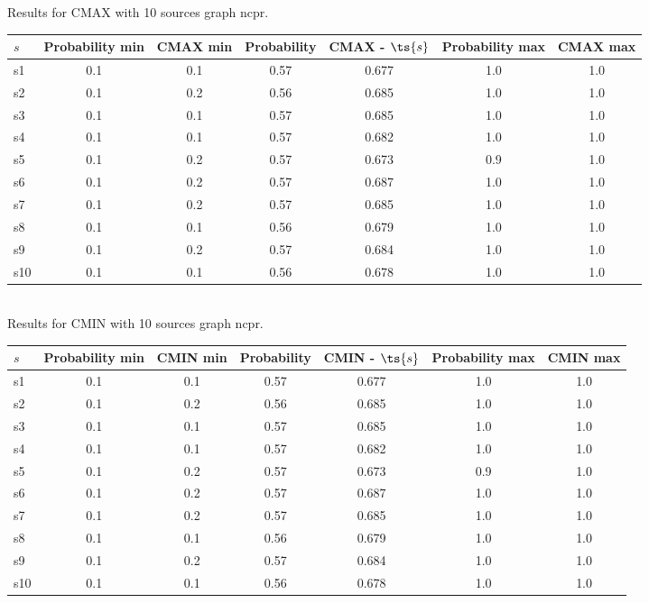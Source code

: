 \documentclass{article}
\begin{document}
\noindent Results for CMAX with 10 sources graph ncpr.

\noindent\begin{tabular}{|l|c|c|c|c|c|c|}
\hline
$s$& Probability min & CMAX min & Probability & CMAX - $\ts{s}$ & Probability max & CMAX max\\
\hline
s1 &0.1 & 0.1 & 0.57 & 0.677 & 1.0 & 1.0\\
\hline
s2 &0.1 & 0.2 & 0.56 & 0.685 & 1.0 & 1.0\\
\hline
s3 &0.1 & 0.1 & 0.57 & 0.685 & 1.0 & 1.0\\
\hline
s4 &0.1 & 0.1 & 0.57 & 0.682 & 1.0 & 1.0\\
\hline
s5 &0.1 & 0.2 & 0.57 & 0.673 & 0.9 & 1.0\\
\hline
s6 &0.1 & 0.2 & 0.57 & 0.687 & 1.0 & 1.0\\
\hline
s7 &0.1 & 0.2 & 0.57 & 0.685 & 1.0 & 1.0\\
\hline
s8 &0.1 & 0.1 & 0.56 & 0.679 & 1.0 & 1.0\\
\hline
s9 &0.1 & 0.2 & 0.57 & 0.684 & 1.0 & 1.0\\
\hline
s10 &0.1 & 0.1 & 0.56 & 0.678 & 1.0 & 1.0\\
\hline
\end{tabular}\\

\noindent Results for CMIN with 10 sources graph ncpr.

\noindent\begin{tabular}{|l|c|c|c|c|c|c|}
\hline
$s$& Probability min & CMIN min & Probability & CMIN - $\ts{s}$ & Probability max & CMIN max\\
\hline
s1 &0.1 & 0.1 & 0.57 & 0.677 & 1.0 & 1.0\\
\hline
s2 &0.1 & 0.2 & 0.56 & 0.685 & 1.0 & 1.0\\
\hline
s3 &0.1 & 0.1 & 0.57 & 0.685 & 1.0 & 1.0\\
\hline
s4 &0.1 & 0.1 & 0.57 & 0.682 & 1.0 & 1.0\\
\hline
s5 &0.1 & 0.2 & 0.57 & 0.673 & 0.9 & 1.0\\
\hline
s6 &0.1 & 0.2 & 0.57 & 0.687 & 1.0 & 1.0\\
\hline
s7 &0.1 & 0.2 & 0.57 & 0.685 & 1.0 & 1.0\\
\hline
s8 &0.1 & 0.1 & 0.56 & 0.679 & 1.0 & 1.0\\
\hline
s9 &0.1 & 0.2 & 0.57 & 0.684 & 1.0 & 1.0\\
\hline
s10 &0.1 & 0.1 & 0.56 & 0.678 & 1.0 & 1.0\\
\hline
\end{tabular}\\
\end{document}
